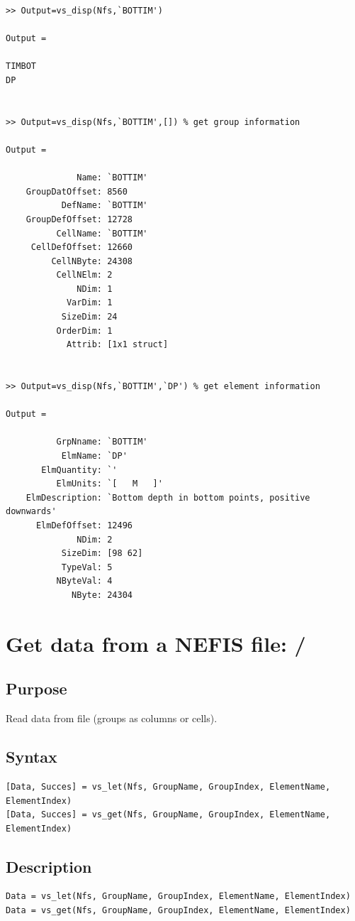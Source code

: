 \begin{Verbatim}
>> Output=vs_disp(Nfs,`BOTTIM')

Output =

TIMBOT
DP


>> Output=vs_disp(Nfs,`BOTTIM',[]) % get group information

Output =

              Name: `BOTTIM'
    GroupDatOffset: 8560
           DefName: `BOTTIM'
    GroupDefOffset: 12728
          CellName: `BOTTIM'
     CellDefOffset: 12660
         CellNByte: 24308
          CellNElm: 2
              NDim: 1
            VarDim: 1
           SizeDim: 24
          OrderDim: 1
            Attrib: [1x1 struct]


>> Output=vs_disp(Nfs,`BOTTIM',`DP') % get element information

Output =

          GrpNname: `BOTTIM'
           ElmName: `DP'
       ElmQuantity: `'
          ElmUnits: `[   M   ]'
    ElmDescription: `Bottom depth in bottom points, positive downwards'
      ElmDefOffset: 12496
              NDim: 2
           SizeDim: [98 62]
           TypeVal: 5
          NByteVal: 4
             NByte: 24304
\end{Verbatim}

\section{Get data from a NEFIS file: \vslet/\vsget}

\subsection*{Purpose}
 Read data from file (groups as columns or cells).

\subsection*{Syntax}
\begin{Verbatim}
[Data, Succes] = vs_let(Nfs, GroupName, GroupIndex, ElementName, ElementIndex)
[Data, Succes] = vs_get(Nfs, GroupName, GroupIndex, ElementName, ElementIndex)
\end{Verbatim}

\subsection*{Description}
\begin{Verbatim}
Data = vs_let(Nfs, GroupName, GroupIndex, ElementName, ElementIndex)
Data = vs_get(Nfs, GroupName, GroupIndex, ElementName, ElementIndex)
\end{Verbatim}

